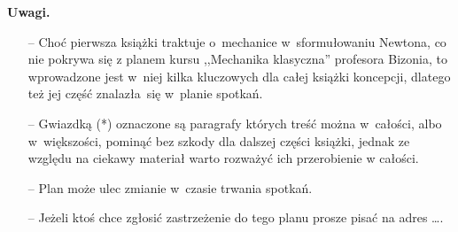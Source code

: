 \documentclass[a4paper,11pt]{article}
\begin{document}
\noindent
\textbf{Uwagi.}
\begin{itemize}
\item[--] Choć pierwsza książki traktuje o~mechanice w~sformułowaniu
  Newtona, co nie pokrywa się z planem kursu ,,Mechanika klasyczna''
  profesora Bizonia, to wprowadzone jest w~niej kilka kluczowych dla
  całej książki koncepcji, dlatego też jej część znalazła~się w~planie
  spotkań.
\item[--] Gwiazdką (*) oznaczone są paragrafy których treść można
  w~całości, albo w~większości, pominąć bez szkody dla dalszej części
  książki, jednak ze względu na ciekawy materiał warto rozważyć ich
  przerobienie w całości.
\item[--] Plan może ulec zmianie w~czasie trwania spotkań.
\item[--] Jeżeli ktoś chce zgłosić zastrzeżenie do tego planu prosze
  pisać na adres \ldots .
\end{itemize}
\end{document}
